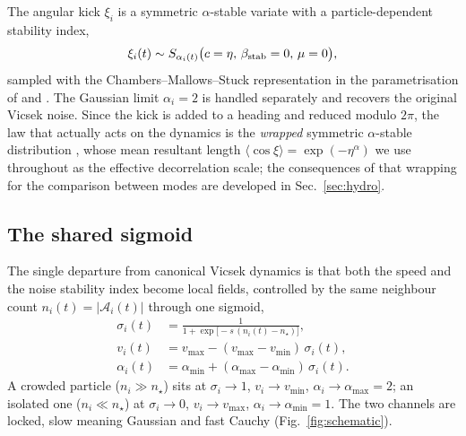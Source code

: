 \documentclass[11pt,a4paper]{article}
\begin{document}
The angular kick $\xi_i$ is a symmetric $\alpha$-stable variate
with a particle-dependent stability index,
\begin{equation}
\xi_i(t) \sim S_{\alpha_i(t)}\bigl(c = \eta,\, \beta_{\rm stab}
   = 0,\, \mu = 0\bigr),
\label{eq:noise}
\end{equation}
sampled with the Chambers--Mallows--Stuck representation
\citep{Chambers1976} in the parametrisation of
\citet{Samorodnitsky1994} and \citet{Nolan2020}. The Gaussian
limit $\alpha_i = 2$ is handled separately and recovers the
original Vicsek noise. Since the kick is added to a heading and
reduced modulo $2\pi$, the law that actually acts on the dynamics
is the \emph{wrapped} symmetric $\alpha$-stable distribution
\citep{Gatto2003, Pewsey2008, Mardia2000}, whose mean resultant
length $\langle\cos\xi\rangle = \exp(-\eta^{\alpha})$ we use
throughout as the effective decorrelation scale; the consequences
of that wrapping for the comparison between modes are developed in
Sec.~\ref{sec:hydro}.

\subsection{The shared sigmoid}

The single departure from canonical Vicsek dynamics is that
both the speed and the noise stability index become local
fields, controlled by the same neighbour count $n_i(t) =
|\mathcal A_i(t)|$ through one sigmoid,
\begin{align}
\sigma_i(t) & = \frac{1}{1 + \exp\bigl[-s\,(n_i(t) -
   n_\star)\bigr]},
\label{eq:sigmoid} \\
v_i(t) & = v_{\max} - (v_{\max} - v_{\min})\,\sigma_i(t),
\label{eq:v_adapt} \\
\alpha_i(t) & = \alpha_{\min} + (\alpha_{\max} - \alpha_{\min})
\,\sigma_i(t).
\label{eq:alpha_adapt}
\end{align}
A crowded particle ($n_i \gg n_\star$) sits at $\sigma_i \to
1$, $v_i \to v_{\min}$, $\alpha_i \to \alpha_{\max} = 2$; an
isolated one ($n_i \ll n_\star$) at $\sigma_i \to 0$, $v_i \to
v_{\max}$, $\alpha_i \to \alpha_{\min} = 1$. The two channels
are locked, slow meaning Gaussian and fast Cauchy
(Fig.~\ref{fig:schematic}).
\end{document}
